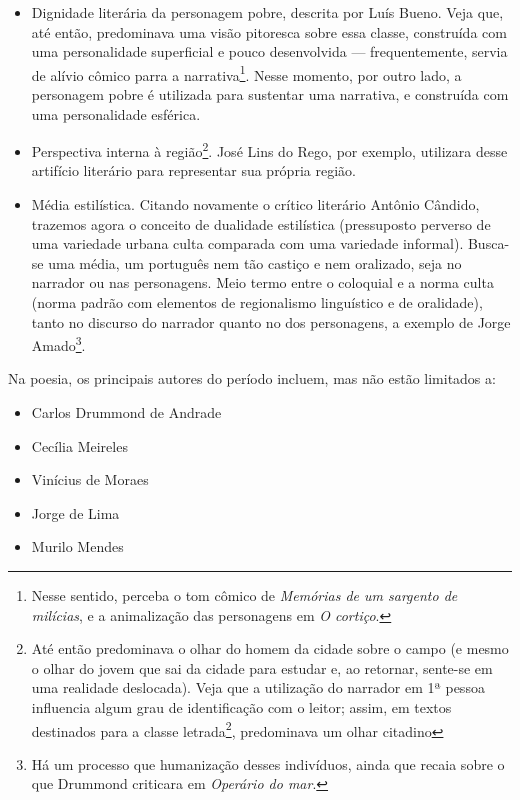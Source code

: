 \begin{itemize}
\item Dignidade literária da personagem pobre, descrita por Luís Bueno. Veja que, até então, predominava uma visão pitoresca sobre essa classe, construída com uma personalidade superficial e pouco desenvolvida — frequentemente, servia de alívio cômico parra a narrativa\footnote{Nesse sentido, perceba o tom cômico de \textit{Memórias de um sargento de milícias}, e a animalização das personagens em \textit{O cortiço}.}. Nesse momento, por outro lado, a personagem pobre é utilizada para sustentar uma narrativa, e construída com uma personalidade esférica.
\item Perspectiva interna à região\footnote{Até então predominava o olhar do homem da cidade sobre o campo (e mesmo o olhar do jovem que sai da cidade para estudar e, ao retornar, sente-se em uma realidade deslocada). Veja que a utilização do narrador em 1ª pessoa influencia algum grau de identificação com o leitor; assim, em textos destinados para a classe letrada\footnote{Nessa época, em centros urbanos — que concentravam a maior parte da população alfabetizada —, a taxa de alfabetização era inferior a um terço da população.}, predominava um olhar citadino}. José Lins do Rego, por exemplo, utilizara desse artifício literário para representar sua própria região.
\item Média estilística. Citando novamente o crítico literário Antônio Cândido, trazemos agora o conceito de dualidade estilística (pressuposto perverso de uma variedade urbana culta comparada com uma variedade informal). Busca-se uma média, um português nem tão castiço e nem oralizado, seja no narrador ou nas personagens. Meio termo entre o coloquial e a norma culta (norma padrão com elementos de regionalismo linguístico e de oralidade), tanto no discurso do narrador quanto no dos personagens, a exemplo de Jorge Amado\footnote{Há um processo que humanização desses indivíduos, ainda que recaia sobre o que Drummond criticara em \textit{Operário do mar}.}.
\end{itemize}

Na poesia, os principais autores do período incluem, mas não estão limitados a:
\begin{itemize}
    \item Carlos Drummond de Andrade
    \item Cecília Meireles
    \item Vinícius de Moraes
    \item Jorge de Lima
    \item Murilo Mendes
\end{itemize}

